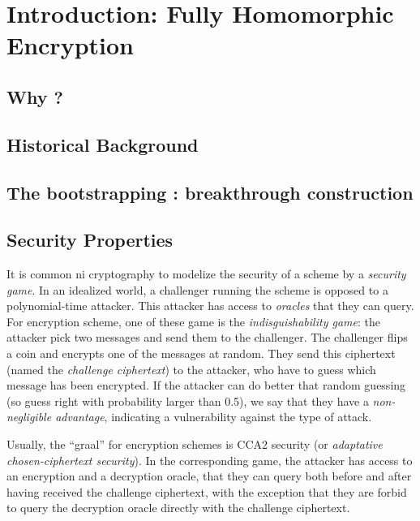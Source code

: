 \chapter{Introduction: Fully Homomorphic Encryption}



\section{Why ?}





\section{Historical Background}






\section{The bootstrapping : breakthrough construction}





\section{Security Properties}



It is common ni cryptography to modelize the security of a scheme by a \textit{security game}. In an idealized world, a challenger running the scheme is opposed to a polynomial-time attacker. This attacker has access to \textit{oracles} that they can query. For encryption scheme, one of these game is the \textit{indisguishability game}: the attacker pick two messages and send them to the challenger. The challenger flips a coin and encrypts one of the messages at random. They send this ciphertext (named the \textit{challenge ciphertext}) to the attacker, who have to guess which message has been encrypted. If the attacker can do better that random guessing (so guess right with probability larger than 0.5), we say that they have a \textit{non-negligible advantage}, indicating a vulnerability against the type of attack.

Usually, the ``graal'' for encryption schemes is \textsf{CCA2} security (or \textit{adaptative chosen-ciphertext security}). In the corresponding game, the attacker has access to an encryption and a decryption oracle, that they can query both before and after having received the challenge ciphertext, with the exception that they are forbid to query the decryption oracle directly with the challenge ciphertext.

